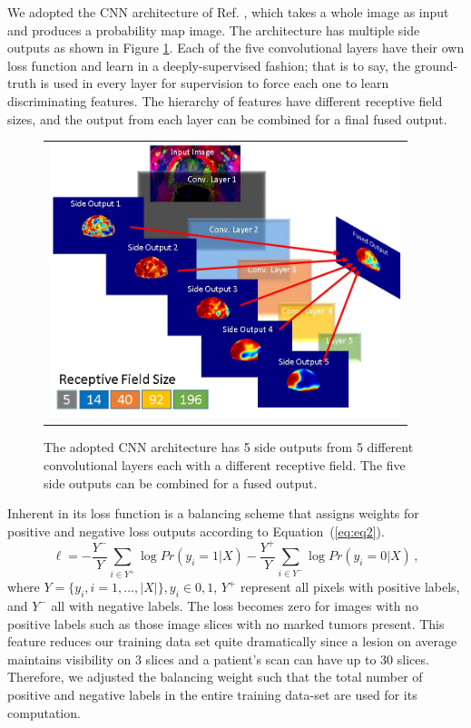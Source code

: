 We adopted the CNN architecture of Ref. , which takes a whole image as input and produces a probability map image. The architecture has multiple side outputs as shown in Figure \ref{fig:Fig4}. Each of the five convolutional layers have their own loss function and learn in a deeply-supervised fashion; that is to say, the ground-truth is used in every layer for supervision to force each one to learn discriminating features. The hierarchy of features have different receptive field sizes, and the output from each layer can be combined for a final fused output. 
\begin{figure} [ht]
   \begin{center}
   \begin{tabular}{c}
   \includegraphics[height=8cm]{Figure4}
   \end{tabular}
   \end{center}
   \caption[Fig4]
   { \label{fig:Fig4} 
The adopted CNN architecture has 5 side outputs from 5 different convolutional layers each with a different receptive field. The five side outputs can be combined for a fused output.}
   \end{figure}
Inherent in its loss function is a balancing scheme that assigns weights for positive and negative loss outputs according to Equation~(\ref{eq:eq2}).
\begin{equation}
\label{eq:eq2}
\ell = - \frac{Y^{-}}{Y}\sum_{i\in Y^{+}} \log Pr(y_i=1|X) - \frac{Y^{+}}{Y} \sum_{i\in Y^{-}} \log Pr(y_i=0|X) \,,
\end{equation}
where $Y = \{y_i, i=1,...,|X|\}, y_i \in {0,1}$, $Y^{+}$ represent all pixels with positive labels, and $Y^{-}$ all with negative labels. The loss becomes zero for images with no positive labels such as those image slices with no marked tumors present. This feature reduces our training data set quite dramatically since a lesion on average maintains visibility on 3 slices and a patient's scan can have up to 30 slices. Therefore, we adjusted the balancing weight such that the total number of positive and negative labels in the entire training data-set are used for its computation.
